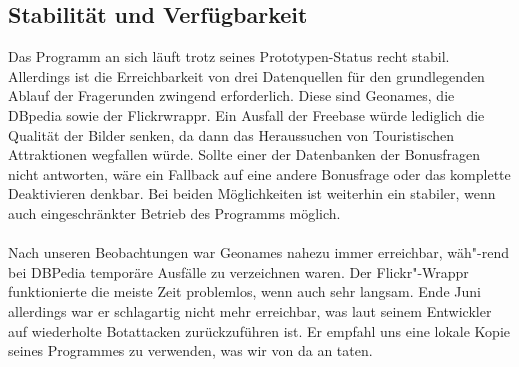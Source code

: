 \documentclass[a4paper, 11pt]{article}
\begin{document}
\subsection{Stabilität und Verfügbarkeit}
Das Programm an sich läuft trotz seines Prototypen-Status recht stabil. Allerdings ist die Erreichbarkeit von drei Datenquellen für den grundlegenden Ablauf der Fragerunden zwingend erforderlich. Diese sind Geonames, die DBpedia sowie der Flickrwrappr. Ein Ausfall der Freebase würde lediglich die Qualität der Bilder senken, da dann das Heraussuchen von Touristischen Attraktionen wegfallen würde. Sollte einer der Datenbanken der Bonusfragen nicht antworten, wäre ein Fallback auf eine andere Bonusfrage oder das komplette Deaktivieren denkbar. Bei beiden Möglichkeiten ist weiterhin ein stabiler, wenn auch eingeschränkter Betrieb des Programms möglich.\\\\ 
Nach unseren Beobachtungen war Geonames nahezu immer erreichbar, wäh"-rend bei DBPedia temporäre Ausfälle zu verzeichnen waren. Der Flickr"-Wrappr funktionierte die meiste Zeit problemlos, wenn auch sehr langsam. Ende Juni allerdings war er schlagartig nicht mehr erreichbar, was laut seinem Entwickler auf wiederholte Botattacken zurückzuführen ist. Er empfahl uns eine lokale Kopie seines Programmes zu verwenden, was wir von da an taten.
\end{document}
